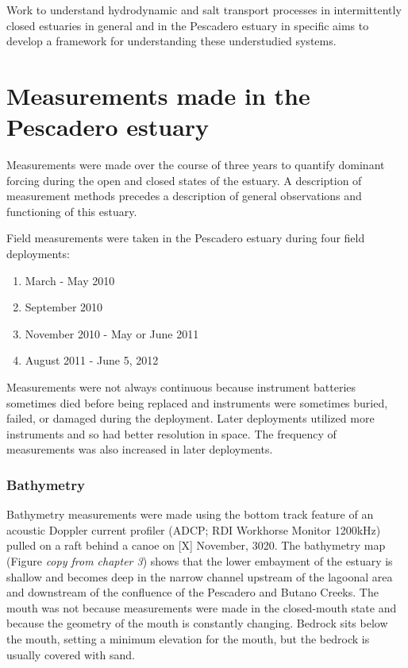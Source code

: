 Work to understand hydrodynamic and salt transport processes in intermittently closed estuaries in general and in the Pescadero estuary in specific aims to develop a framework for understanding these understudied systems. 

\section{Measurements made in the Pescadero estuary} \label{measurementslabel}

Measurements were made over the course of three years to quantify dominant forcing during the open and closed states of the estuary. A description of measurement methods precedes a description of general observations and functioning of this estuary.

Field measurements were taken in the Pescadero estuary during four field deployments:

\begin{enumerate}
	\item March - May 2010 
	\item September 2010 
	\item November 2010 - May or June 2011 
	\item August 2011 - June 5, 2012
\end{enumerate}

 Measurements were not always continuous because instrument batteries sometimes died before being replaced and instruments were sometimes buried, failed, or damaged during the deployment. Later deployments utilized more instruments and so had better resolution in space.  The frequency of measurements was also increased in later deployments. 

\subsubsection{Bathymetry} \label{sssec:bathymetry}
Bathymetry measurements were made using the bottom track feature of an acoustic Doppler current profiler (ADCP; RDI Workhorse Monitor 1200kHz) pulled on a raft behind a canoe on [X] November, 3020. The bathymetry map (Figure \emph{copy from chapter 3}) shows that the lower embayment of the estuary is shallow and becomes deep in the narrow channel upstream of the lagoonal area and downstream of the confluence of the Pescadero and Butano Creeks. The mouth was not because measurements were made in the closed-mouth state and because the geometry of the mouth is constantly changing. Bedrock sits below the mouth, setting a minimum elevation for the mouth, but the bedrock is usually covered with sand. 

